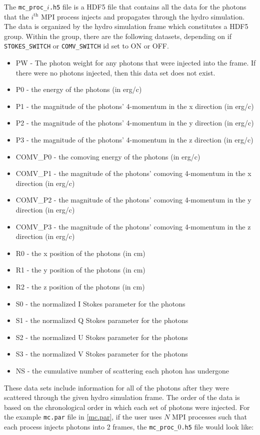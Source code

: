 \documentclass[12pt,a4paper]{article}
\begin{document}
The \texttt{mc\_proc\_$i$.h5} file is a HDF5 file that contains all the data for the photons that the $i^\mathrm{th}$ MPI process injects and propagates through the hydro simulation. The data is organized by the hydro simulation frame which constitutes a HDF5 group. Within the group, there are the following datasets, depending on if \texttt{STOKES\_SWITCH} or \texttt{COMV\_SWITCH} id set to ON or OFF.
\begin{itemize}
\item PW - The photon weight for any photons that were injected into the frame. If there were no photons injected, then this data set does not exist.
\item P0 - the energy of the photons (in erg/c)
\item P1 - the magnitude of the photons' 4-momentum in the x direction (in erg/c)
\item P2 - the magnitude of the photons' 4-momentum in the y direction  (in erg/c)
\item P3 - the magnitude of the photons' 4-momentum in the z direction (in erg/c)
\item COMV\_P0 - the comoving energy of the photons (in erg/c)
\item COMV\_P1 - the magnitude of the photons' comoving 4-momentum in the x direction (in erg/c)
\item COMV\_P2 - the magnitude of the photons' comoving 4-momentum in the y direction  (in erg/c)
\item COMV\_P3 - the magnitude of the photons' comoving 4-momentum in the z direction (in erg/c)
\item R0 - the x position of the photons (in cm)
\item R1 - the y position of the photons (in cm)
\item R2 - the z position of the photons (in cm)
\item S0 - the normalized I Stokes parameter for the photons
\item S1 - the normalized Q Stokes parameter for the photons
\item S2 - the normalized U Stokes parameter for the photons
\item S3 - the normalized V Stokes parameter for the photons
\item NS - the cumulative number of scattering each photon has undergone
\end{itemize}

These data sets include information for all of the photons after they were scattered through the given hydro simulation frame. The order of the data is based on the chronological order in which each set of photons were injected. For the example \texttt{mc.par} file in \autoref{mc.par}, if the user uses $N$ MPI processes such that each process injects photons into 2 frames, the \texttt{mc\_proc\_$0$.h5} file would look like:
\begin{figure}[h!]
 \end{figure}
 
\end{document}
